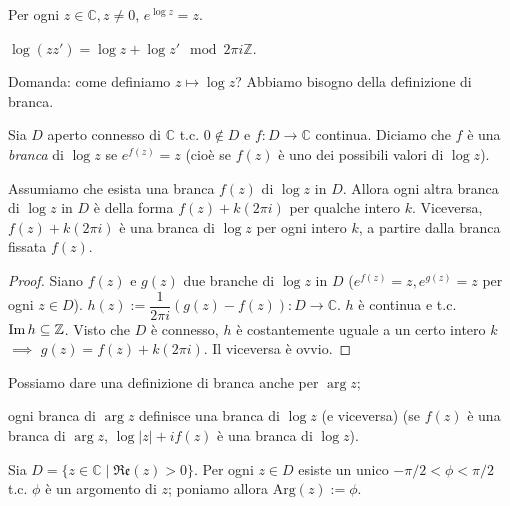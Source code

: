 \begin{prop}
  Per ogni $z \in \mathbb{C}, z \not=0$, $e^{\log{z}}=z$.
\end{prop}

\begin{ftt}
  $\log{(zz')}=\log{z}+\log{z'} \mod{2\pi i \mathbb{Z}}$.
\end{ftt}

Domanda: come definiamo $z \longmapsto \log{z}$? Abbiamo bisogno della definizione di branca.

\begin{defn}
  Sia $D$ aperto connesso di $\mathbb{C}$ t.c. $0 \not\in D$ e $f:D \longrightarrow \mathbb{C}$ continua. Diciamo che $f$ è una \textit{branca} di $\log{z}$ se $e^{f(z)}=z$ (cioè se $f(z)$ è uno dei possibili valori di $\log{z}$).
\end{defn}

\begin{prop}
  Assumiamo che esista una branca $f(z)$ di $\log{z}$ in $D$. Allora ogni altra branca di $\log{z}$ in $D$ è della forma $f(z)+k(2\pi i)$ per qualche intero $k$. Viceversa, $f(z)+k(2 \pi i)$ è una branca di $\log{z}$ per ogni intero $k$, a partire dalla branca fissata $f(z)$.
\end{prop}

\begin{proof}
  Siano $f(z)$ e $g(z)$ due branche di $\log{z}$ in $D$ ($e^{f(z)}=z, e^{g(z)}=z$ per ogni $z \in D$). $h(z):=\dfrac{1}{2\pi i}(g(z)-f(z)):D \longrightarrow \mathbb{C}$. $h$ è continua e t.c. $\operatorname{Im}{h} \subseteq \mathbb{Z}$.
  Visto che $D$ è connesso, $h$ è costantemente uguale a un certo intero $k$ $\implies$ $g(z)=f(z)+k(2\pi i)$. Il viceversa è ovvio.
\end{proof}

\begin{oss}
  \begin{nlist}
    \item Possiamo dare una definizione di branca anche per $\arg{z}$;
    \item ogni branca di $\arg{z}$ definisce una branca di $\log{z}$ (e viceversa) (se $f(z)$ è una branca di $\arg{z}$, $\log{|z|}+if(z)$ è una branca di $\log{z}$).
  \end{nlist}
\end{oss}

\begin{oss}
  Sia $D=\{z \in \mathbb{C} \mid \mathfrak{Re}(z)>0\}$. Per ogni $z \in D$ esiste un unico $-\pi/2<\phi<\pi/2$ t.c. $\phi$ è un argomento di $z$; poniamo allora $\text{Arg}(z):=\phi$.
\end{oss}

